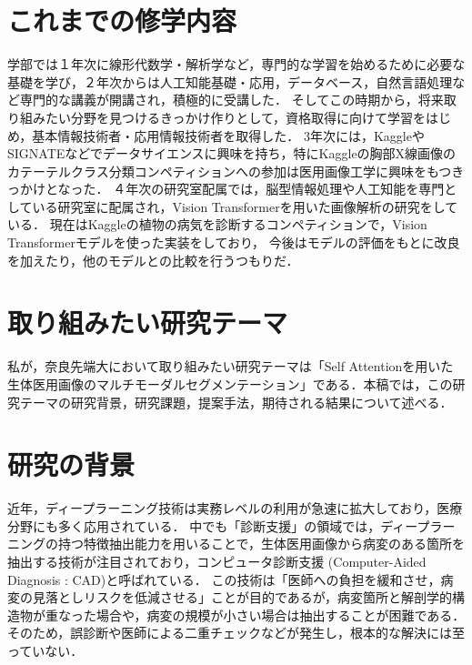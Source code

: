 \documentclass[a4j,10pt,twocolumn]{jarticle}
\begin{document}
\section{これまでの修学内容}
学部では１年次に線形代数学・解析学など，専門的な学習を始めるために必要な基礎を学び，２年次からは人工知能基礎・応用，データベース，自然言語処理など専門的な講義が開講され，積極的に受講した．
そしてこの時期から，将来取り組みたい分野を見つけるきっかけ作りとして，資格取得に向けて学習をはじめ，基本情報技術者・応用情報技術者を取得した．
3年次には，KaggleやSIGNATEなどでデータサイエンスに興味を持ち，特にKaggleの胸部X線画像のカテーテルクラス分類コンペティションへの参加は医用画像工学に興味をもつきっかけとなった．
４年次の研究室配属では，脳型情報処理や人工知能を専門としている研究室に配属され，Vision Transformerを用いた画像解析の研究をしている．
現在はKaggleの植物の病気を診断するコンペティションで，Vision Transformerモデルを使った実装をしており，
今後はモデルの評価をもとに改良を加えたり，他のモデルとの比較を行うつもりだ．

\section{取り組みたい研究テーマ}
私が，奈良先端大において取り組みたい研究テーマは「Self Attentionを用いた生体医用画像のマルチモーダルセグメンテーション」である．本稿では，この研究テーマの研究背景，研究課題，提案手法，期待される結果について述べる．

\section{研究の背景}
近年，ディープラーニング技術は実務レベルの利用が急速に拡大しており，医療分野にも多く応用されている．
中でも「診断支援」の領域では，ディープラーニングの持つ特徴抽出能力を用いることで，生体医用画像から病変のある箇所を抽出する技術が注目されており，コンピュータ診断支援 (Computer-Aided Diagnosis : CAD)と呼ばれている． 
この技術は「医師への負担を緩和させ，病変の見落としリスクを低減させる」ことが目的であるが，病変箇所と解剖学的構造物が重なった場合や，病変の規模が小さい場合は抽出することが困難である．
そのため，誤診断や医師による二重チェックなどが発生し，根本的な解決には至っていない．
\end{document}
